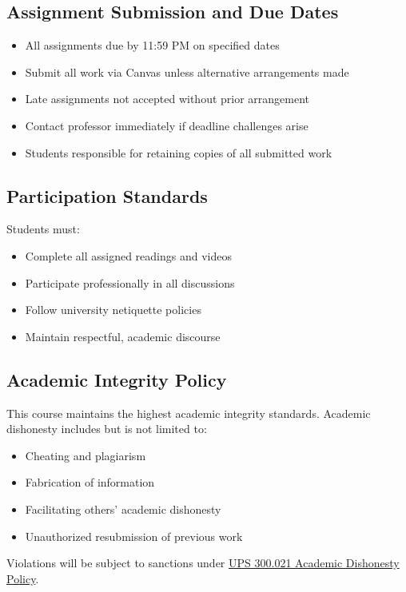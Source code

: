 \documentclass[12pt]{article}
\begin{document}
\subsection*{Assignment Submission and Due Dates}
\begin{itemize}
\item All assignments due by 11:59 PM on specified dates
\item Submit all work via Canvas unless alternative arrangements made
\item Late assignments not accepted without prior arrangement
\item Contact professor immediately if deadline challenges arise
\item Students responsible for retaining copies of all submitted work
\end{itemize}

\subsection*{Participation Standards}
Students must:
\begin{itemize}
\item Complete all assigned readings and videos
\item Participate professionally in all discussions
\item Follow university netiquette policies
\item Maintain respectful, academic discourse
\end{itemize}

\subsection*{Academic Integrity Policy}
This course maintains the highest academic integrity standards. Academic dishonesty includes but is not limited to:
\begin{itemize}
\item Cheating and plagiarism
\item Fabrication of information
\item Facilitating others' academic dishonesty
\item Unauthorized resubmission of previous work
\end{itemize}

Violations will be subject to sanctions under \href{https://www.fullerton.edu/senate/publications_policies_resolutions/ups/UPS%20300/UPS%20300.021.pdf}{UPS 300.021 Academic Dishonesty Policy}.
\end{document}
